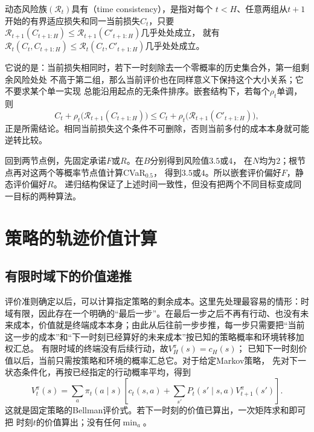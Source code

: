 \begin{definition}[递归意义下的时间一致性]
\label{def:decision-time-consistency}
动态风险族$(\mathcal R_t)$具有（time consistency），是指对每个
$t<H$、任意两组从$t+1$开始的有界适应损失和同一当前损失$C_t$，只要
$\mathcal R_{t+1}(C_{t+1:H})\leq\mathcal R_{t+1}(C'_{t+1:H})$几乎处处成立，
就有$\mathcal R_t(C_t,C_{t+1:H})\leq\mathcal R_t(C_t,C'_{t+1:H})$几乎处处成立。
\end{definition}
它说的是：当前损失相同时，若下一时刻除去一个零概率的历史集合外，第一组剩余风险处处
不高于第二组，那么当前评价也在同样意义下保持这个大小关系；它不要求某个单一实现
总能沿用起点的无条件排序。嵌套结构下，若每个$\rho_t$单调，则
\[
  C_t+\rho_t\bigl(\mathcal R_{t+1}(C_{t+1:H})\bigr)
  \leq
  C_t+\rho_t\bigl(\mathcal R_{t+1}(C'_{t+1:H})\bigr),
\]
正是所需结论。相同当前损失这个条件不可删除，否则当前多付的成本本身就可能逆转比较。

回到两节点例，先固定承诺$F$或$R$。在$B$分别得到风险值$3.5$或$4$，
在$N$均为$2$；根节点再对这两个等概率节点值计算CVaR$_{0.5}$，
得到$3.5$或$4$。所以嵌套评价偏好$F$，静态评价偏好$R$。
递归结构保证了上述时间一致性，但没有把两个不同目标变成同一目标的两种算法。

\section{策略的轨迹价值计算}
\label{sec:policy-value-evaluation}

\subsection{有限时域下的价值递推}
\label{sec:policy-finite-evaluation}

评价准则确定以后，可以计算指定策略的剩余成本。这里先处理最容易的情形：时域有限，因此存在一个明确的“最后一步”。在最后一步之后不再有行动、也没有未来成本，价值就是终端成本本身；由此从后往前一步步推，每一步只需要把“当前这一步的成本”和“下一时刻已经算好的未来成本”按已知的策略概率和环境转移加权汇总。
有限时域的终端没有后续行动，故$V_H^\pi(s)=c_H(s)$；
已知下一时刻价值以后，当前只需按策略和环境的概率汇总它。对于给定Markov策略，
先对下一状态条件化，再按已经指定的行动概率平均，得到
\begin{equation}
  V_t^\pi(s)=\sum_a\pi_t(a\mid s)
  \left[c_t(s,a)+\sum_{s'}P_t(s'\mid s,a)V_{t+1}^\pi(s')\right].
  \label{eq:decision-policy-bellman}
\end{equation}
这就是固定策略的Bellman评价式。若下一时刻的价值已算出，一次矩阵求和即可把
时刻$t$的价值算出；没有任何$\min_a$。

